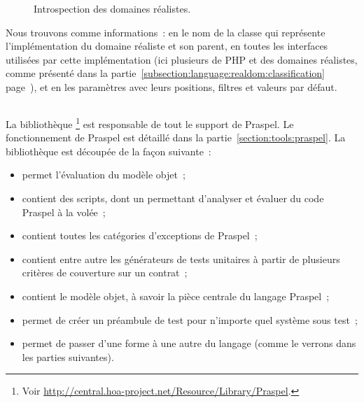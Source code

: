 \begin{example}
\begin{figure}
\caption{\label{figure:tools:reflection-realdom} Introspection des domaines
réalistes.}

\end{figure}
%
Nous trouvons comme informations~: en  le nom de la classe qui
représente l'implémentation du domaine réaliste et son parent, en 
toutes les interfaces utilisées par cette implémentation (ici plusieurs de PHP
et des domaines réalistes, comme présenté dans la
partie~\ref{subsection:language:realdom:classification}
page~\pageref{subsection:language:realdom:classification}), et en 
les paramètres avec leurs positions, filtres et valeurs par défaut.

\end{example}

\subsection{}
\label{subsection:tools:hoa-praspel}

La bibliothèque \footnote{Voir
\url{http://central.hoa-project.net/Resource/Library/Praspel}.} est responsable
de tout le support de Praspel. Le fonctionnement de Praspel est détaillé dans la
partie~\ref{section:tools:praspel}. La bibliothèque est découpée de la façon
suivante~:
%
\begin{itemize}

\item {} permet l'évaluation du modèle objet~;

\item {} contient des scripts, dont un  permettant
d'analyser et évaluer du code Praspel à la volée~;

\item {} contient toutes les catégories d'exceptions de Praspel~;

\item {} contient entre autre les générateurs de tests unitaires à
partir de plusieurs critères de couverture sur un contrat~;

\item {} contient le modèle objet, à savoir la pièce centrale du
langage Praspel~;

\item {} permet de créer un préambule de test pour n'importe quel
système sous test~;

\item {} permet de passer d'une forme à une autre du langage (comme
le verrons dans les parties suivantes).

\end{itemize}

